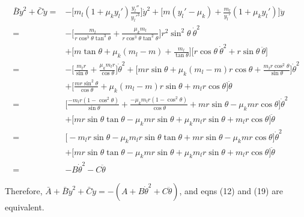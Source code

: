 \documentclass[12pt]{article}
\begin{document}
\begin{align*}
    \bar B \dot y^2 + \bar C \ddot y = & - \biggl[ m_l (1 + \mu_k y_l') \frac{y_l''}{y_l'^3} \biggr] \dot{y}^2 + \biggl[ m (y_l' - \mu_k) + \frac{m_l}{y_l'} (1 + \mu_k y_l') \biggr] \ddot{y} \\
    = & -\biggl[\frac{m_l}{r \cos^3 \theta \tan^3 \theta} + \frac{\mu_k m_l}{r \cos^3 \theta \tan^2 \theta}\biggr] r^2 \sin^2 \theta \ \dot \theta^2 \\ 
    & + \biggl[ m \tan \theta + \mu_k (m_l - m) + \frac{m_l}{\tan \theta} \biggr]\biggl[ r \cos\theta \ \dot\theta^2 + r \sin\theta \ \ddot\theta \biggr] \\
    = & -\biggl[\frac{m_l r}{\sin \theta} + \frac{\mu_k m_l r}{\cos \theta}\biggr] \dot \theta^2 + \biggl[ m r \sin \theta + \mu_k (m_l - m) r \cos\theta + \frac{m_l r \cos^2 \theta}{\sin \theta} \biggr] \dot\theta^2 \\
    & + \biggl[ \frac{m r \sin^2 \theta}{\cos\theta} + \mu_k (m_l - m) r \sin\theta + m_l r \cos\theta \biggr] \ddot\theta \\
    = & \biggl[ \frac{- m_l r (1 - \cos^2 \theta)}{\sin\theta} + \frac{- \mu_k m_l r (1 - \cos^2\theta)}{\cos\theta} + m r \sin\theta - \mu_k m r \cos\theta \biggr] \dot\theta^2 \\
    & + \biggl[ mr \sin\theta \tan\theta  - \mu_k m r \sin\theta + \mu_k m_l r \sin\theta + m_l r \cos\theta \biggr] \ddot\theta \\
    = & \biggl[ - m_l r \sin\theta - \mu_k m_l r \sin\theta \tan\theta + m r \sin\theta - \mu_k m r \cos\theta \biggr] \dot\theta^2 \\
    & + \biggl[ mr \sin\theta \tan\theta  - \mu_k m r \sin\theta + \mu_k m_l r \sin\theta + m_l r \cos\theta \biggr] \ddot\theta \\
    = & -B \dot\theta^2 - C \ddot \theta
\end{align*}

Therefore, $\bar{A} + \bar B \dot y^2 + \bar C \ddot y = -(A + B \dot\theta^2 + C\ddot\theta)$, and eqns (12) and (19) are equivalent.
\end{document}
